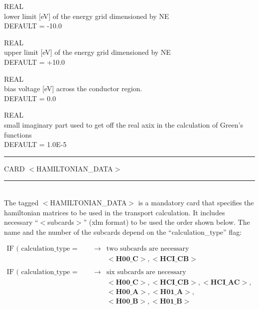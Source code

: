 {\noindent{}%
REAL \\ lower limit [eV] of the energy grid dimensioned by NE \\ DEFAULT = -10.0 \par

\noindent{}%
REAL \\ upper limit [eV] of the energy grid dimensioned by NE \\ DEFAULT = +10.0 \par

\noindent{}%
REAL \\ bias voltage [eV] across the conductor region. \\ DEFAULT = 0.0 \par

\noindent{}%
REAL \\  small imaginary part used to get off the real axix in the calculation
            of Green's functions \\ DEFAULT = 1.0E-5 \par
}\bigskip

\begin{centering}
\rule{2.0in}{0.01in} CARD $<$HAMILTONIAN\_DATA$>$ \rule{2.0in}{0.01in}
\end{centering}\\

\noindent The tagged $<$HAMILTONIAN\_DATA$>$ is a mandatory card that specifies
the hamiltonian matrices to be used in the transport calculation. It includes necessary
``$<$subcards$>$'' (xlm format) to be used the order shown below. The name and the number of the subcards
depend on the ``calculation\_type'' flag:

\begin{displaymath}
\begin{array}{lll}
\textrm{IF ( calculation\_type = ``bulk'' )}       & \rightarrow & \textrm{two subcards are necessary}\\
\textrm{}                                          & \textrm{}   & <\textbf{H00\_C}>,<\textbf{HCI\_CB}>\\
\textrm{}                                          & \textrm{}   & \textbf{}\\
\textrm{IF ( calculation\_type = ``conductor'' )}  & \rightarrow & \textrm{six subcards are necessary}\\
\textrm{}                                          & \textrm{}   & <\textbf{H00\_C}>,<\textbf{HCI\_CB}>,<\textbf{HCI\_AC}>,\\
\textrm{}                                          & \textrm{}   & <\textbf{H00\_A}>,<\textbf{H01\_A}>,\\
\textrm{}                                          & \textrm{}   & <\textbf{H00\_B}>, <\textbf{H01\_B}>\\
\end{array}
\end{displaymath}

